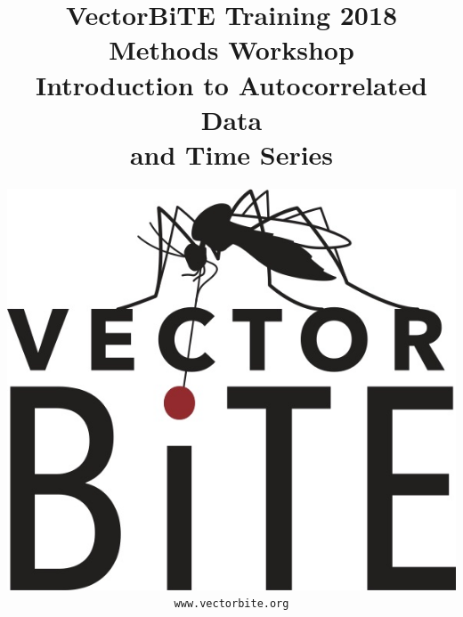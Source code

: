 \documentclass[12pt,xcolor=svgnames]{beamer}
\newcommand{\rd}{\color{red}}
\newcommand{\org}{\color{Orange}}
\newcommand{\gr}{\color{gray}}
\newcommand{\theme}{\color{FireBrick}}
\begin{document}
{ \usebackgroundtemplate{}%
\thispagestyle{empty}
\setcounter{page}{0}

\title{\theme \Large \vskip 0.5cm
{\bf VectorBiTE Training 2018 \\ Methods Workshop}\\
\bigskip
\bf {\sf \gr Introduction to Autocorrelated Data \\ and Time Series}}

\author{
\begin{center}
\includegraphics[scale=0.15,trim=10 10 0 150]{VB_logo.jpg}
\end{center}
\texttt{\rd\small www.vectorbite.org}
}
\date{}
\maketitle 
}





\end{document}
